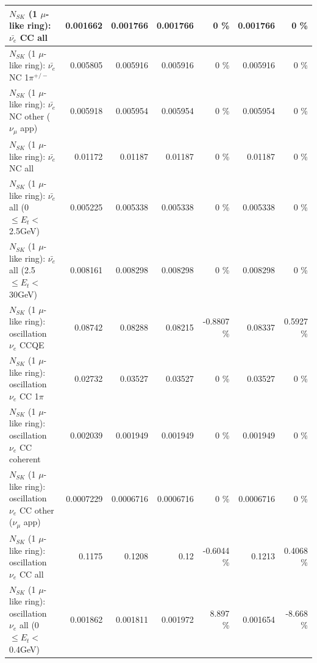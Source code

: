 \begin{table}
\begin{tabular}{| l | r | r | r  r | r  r |}
                            $N_{SK}$ (1 $\mu$-like ring): $\bar{\nu_{e}}$ CC all &        0.001662 &        0.001766 &        0.001766 &        0 \%  &        0.001766 &        0 \%  \\ 
\hline
                     $N_{SK}$ (1 $\mu$-like ring): $\bar{\nu_e}$ NC 1$\pi^{+/-}$ &        0.005805 &        0.005916 &        0.005916 &        0 \%  &        0.005916 &        0 \%  \\ 
            $N_{SK}$ (1 $\mu$-like ring): $\bar{\nu_e}$ NC other ($\nu_\mu$ app) &        0.005918 &        0.005954 &        0.005954 &        0 \%  &        0.005954 &        0 \%  \\ 
                            $N_{SK}$ (1 $\mu$-like ring): $\bar{\nu_{e}}$ NC all &         0.01172 &         0.01187 &         0.01187 &        0 \%  &         0.01187 &        0 \%  \\ 
\hline
     $N_{SK}$ (1 $\mu$-like ring): $\bar{\nu_{e}}$ all (0 $\leq E_{t} <$ 2.5GeV) &        0.005225 &        0.005338 &        0.005338 &        0 \%  &        0.005338 &        0 \%  \\ 
    $N_{SK}$ (1 $\mu$-like ring): $\bar{\nu_{e}}$ all (2.5 $\leq E_{t} <$ 30GeV) &        0.008161 &        0.008298 &        0.008298 &        0 \%  &        0.008298 &        0 \%  \\ 
\hline
\hline
\hline
                          $N_{SK}$ (1 $\mu$-like ring): oscillation $\nu_e$ CCQE &         0.08742 &         0.08288 &         0.08215 &  -0.8807 \%  &         0.08337 &   0.5927 \%  \\ 
                     $N_{SK}$ (1 $\mu$-like ring): oscillation $\nu_e$ CC 1$\pi$ &         0.02732 &         0.03527 &         0.03527 &        0 \%  &         0.03527 &        0 \%  \\ 
                   $N_{SK}$ (1 $\mu$-like ring): oscillation $\nu_e$ CC coherent &        0.002039 &        0.001949 &        0.001949 &        0 \%  &        0.001949 &        0 \%  \\ 
      $N_{SK}$ (1 $\mu$-like ring): oscillation $\nu_e$ CC other ($\nu_\mu$ app) &       0.0007229 &       0.0006716 &       0.0006716 &        0 \%  &       0.0006716 &        0 \%  \\ 
                       $N_{SK}$ (1 $\mu$-like ring): oscillation $\nu_e$  CC all &          0.1175 &          0.1208 &            0.12 &  -0.6044 \%  &          0.1213 &   0.4068 \%  \\ 
\hline
$N_{SK}$ (1 $\mu$-like ring): oscillation $\nu_{e}$ all (0 $\leq E_{t} <$ 0.4GeV) &        0.001862 &        0.001811 &        0.001972 &    8.897 \%  &        0.001654 &   -8.668 \%  \\ 

\end{tabular}
\end{table}
